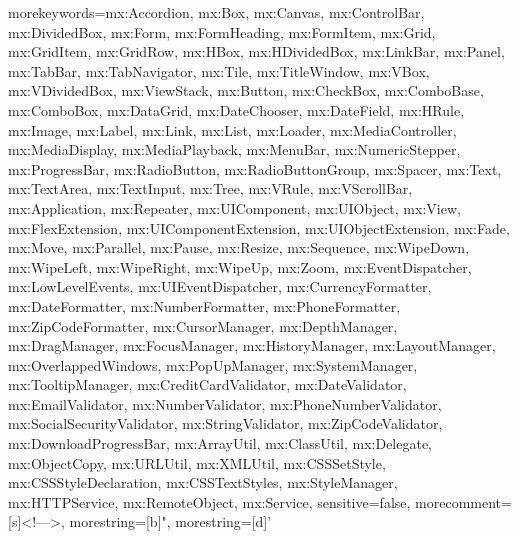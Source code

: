  {morekeywords={mx:Accordion, mx:Box, mx:Canvas, mx:ControlBar, mx:DividedBox, mx:Form, mx:FormHeading, mx:FormItem, mx:Grid, mx:GridItem, mx:GridRow, mx:HBox, mx:HDividedBox, mx:LinkBar, mx:Panel, mx:TabBar, mx:TabNavigator, mx:Tile, mx:TitleWindow, mx:VBox, mx:VDividedBox, mx:ViewStack, mx:Button, mx:CheckBox, mx:ComboBase, mx:ComboBox, mx:DataGrid, mx:DateChooser, mx:DateField, mx:HRule, mx:Image, mx:Label, mx:Link, mx:List, mx:Loader, mx:MediaController, mx:MediaDisplay, mx:MediaPlayback, mx:MenuBar, mx:NumericStepper, mx:ProgressBar, mx:RadioButton, mx:RadioButtonGroup, mx:Spacer, mx:Text, mx:TextArea, mx:TextInput, mx:Tree, mx:VRule, mx:VScrollBar, mx:Application, mx:Repeater, mx:UIComponent, mx:UIObject, mx:View, mx:FlexExtension, mx:UIComponentExtension, mx:UIObjectExtension, mx:Fade, mx:Move, mx:Parallel, mx:Pause, mx:Resize, mx:Sequence, mx:WipeDown, mx:WipeLeft, mx:WipeRight, mx:WipeUp, mx:Zoom, mx:EventDispatcher, mx:LowLevelEvents, mx:UIEventDispatcher, mx:CurrencyFormatter, mx:DateFormatter, mx:NumberFormatter, mx:PhoneFormatter, mx:ZipCodeFormatter, mx:CursorManager, mx:DepthManager, mx:DragManager, mx:FocusManager, mx:HistoryManager, mx:LayoutManager, mx:OverlappedWindows, mx:PopUpManager, mx:SystemManager, mx:TooltipManager, mx:CreditCardValidator, mx:DateValidator, mx:EmailValidator, mx:NumberValidator, mx:PhoneNumberValidator, mx:SocialSecurityValidator, mx:StringValidator, mx:ZipCodeValidator, mx:DownloadProgressBar, mx:ArrayUtil, mx:ClassUtil, mx:Delegate, mx:ObjectCopy, mx:URLUtil, mx:XMLUtil, mx:CSSSetStyle, mx:CSSStyleDeclaration, mx:CSSTextStyles, mx:StyleManager, mx:HTTPService, mx:RemoteObject, mx:Service},
sensitive=false, morecomment=[s]{<!--}{-->}, morestring=[b]", morestring=[d]'}

